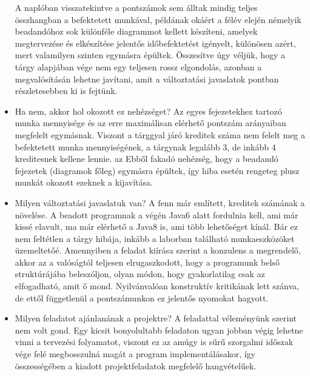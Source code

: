 \begin{itemize}
A naplóban visszatekintve a pontszámok sem álltak mindig teljes összhangban a befektetett munkával, példának okáért a félév elején némelyik beadandóhoz sok különféle diagrammot kellett készíteni, amelyek megtervezése és elkészítése jelentős időbefektetést igényelt, különösen azért, mert valamilyen szinten egymásra épültek.\newline \newline
Összesítve úgy véljük, hogy a tárgy alapjában vége nem egy teljesen rossz elgondolás, azonban a megvalósításán lehetne javítani, amit a változtatási javaslatok pontban részletesebben ki is fejtünk.
\item Ha nem, akkor hol okozott ez nehézséget? \newline
Az egyes fejezetekhez tartozó munka mennyisége és az erre maximálisan elérhető pontszám arányaiban megfelelt egymásnak. Viszont a tárggyal járó kreditek száma nem felelt meg a befektetett munka mennyiségének, a tárgynak legalább 3, de inkább 4 kreditesnek kellene lennie. az Ebből fakadó nehézség, hogy a beadandó fejezetek (diagramok főleg) egymásra épültek, így hiba esetén rengeteg plusz munkát okozott ezeknek a kijavítása.
\item Milyen változtatási javaslatuk van? \newline
A fenn már említett, kreditek számának a növelése.\newline \newline
A beadott programnak a végén Java6 alatt fordulnia kell, ami már kissé elavult, ma már elérhető a Java8 is, ami több lehetőséget kínál. Bár ez nem feltétlen a tárgy hibája, inkább a laborban található munkaeszközöket üzemeltetőé.\newline \newline
Amennyiben a feladat kiírása szerint a konzulens a megrendelő, akkor az a valóságtól teljesen elrugaszkodott, hogy a programunk belső struktúrájába beleszóljon, olyan módon, hogy gyakorlatilag csak az elfogadható, amit ő mond. Nyilvánvalóan konstruktív kritikának lett szánva, de ettől függetlenül a pontszámunkon ez jelentős nyomokat hagyott.

\item Milyen feladatot ajánlanának a projektre? \newline
A feladattal véleményünk szerint nem volt gond. Egy kicsit bonyolultabb feladaton ugyan jobban végig lehetne vinni a tervezési folyamatot, viszont ez az amúgy is sűrű szorgalmi időszak vége felé megbosszulná magát a program implementálásakor, így összességében a kiadott projektfeladatok megfelelő hangvételűek.
\end{itemize}

